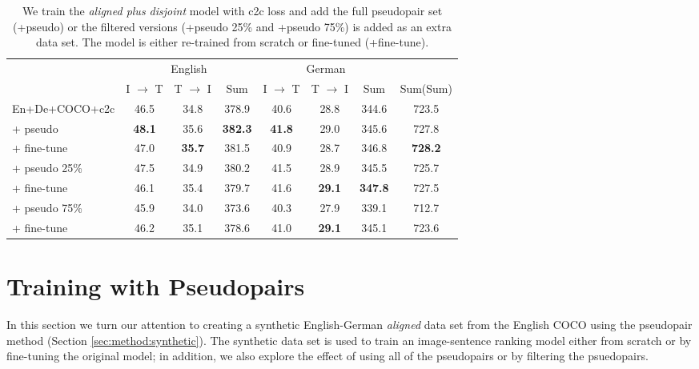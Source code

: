 \begin{table*}[ht]
    \centering
    \renewcommand{\arraystretch}{1.0}
    \begin{tabular}{lccccccc}
        \toprule
         & \multicolumn{3}{c}{English}  & \multicolumn{3}{c}{German}\\
         \cmidrule(lr){2-4} \cmidrule(lr){5-7}
         & I $\rightarrow$ T & T $\rightarrow$ I & Sum 
         & I $\rightarrow$ T & T $\rightarrow$ I & Sum & Sum(Sum)\\
         \midrule
         En+De+COCO+c2c & 46.5 & 34.8 & 378.9 & 40.6 & 28.8 & 344.6 & 723.5\\
         \: \: + pseudo & \textbf{48.1}  & 35.6 & \textbf{382.3} & \textbf{41.8}  & 29.0  & 345.6 & 727.8 \\
          \: \: \: + fine-tune & 47.0 & \textbf{35.7}  & 381.5  & 40.9  & 28.7 & 346.8 & \textbf{728.2} \\
          \: \: + pseudo 25\% &  47.5  & 34.9 &  380.2 &  41.5 & 28.9 &  345.5 & 725.7\\
           \: \: \: + fine-tune &  46.1 & 35.4 &  379.7  &  41.6 & \textbf{29.1} & \textbf{347.8} & 727.5\\
          \: \: + pseudo 75\% &  45.9  & 34.0 & 373.6  & 40.3  & 27.9 &  339.1 & 712.7\\
          \: \: \: + fine-tune & 46.2  & 35.1 & 378.6  &  41.0 & \textbf{29.1}  &  345.1 & 723.6\\
         \bottomrule
    \end{tabular}
    \caption{We train the \emph{aligned plus disjoint} model with 
    c2c loss and add the full pseudopair set (+pseudo) or the filtered versions (+pseudo 25\% and +pseudo 75\%) is added as an extra data set. The model is either re-trained from scratch or fine-tuned (+fine-tune).}
    \label{tab:pseudoalignedplus}
\end{table*}

\section{Training with Pseudopairs}
\label{sec:pseudo}

In this section we turn our attention to creating a synthetic English-German \emph{aligned} data set from the English COCO using the pseudopair method (Section \ref{sec:method:synthetic}). The synthetic data set is used to train an image-sentence ranking model either from scratch or by fine-tuning the original model; in addition, we also explore the effect of using all of the pseudopairs or by filtering the psuedopairs.

